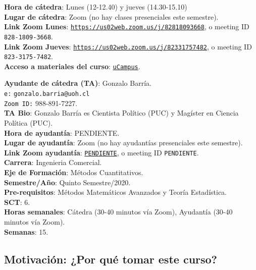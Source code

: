 \documentclass[letterpaper]{article}
\begin{document}
\vspace{5mm}
{\bf Hora de c\'atedra}: Lunes (12-12.40) y jueves (14.30-15.10)\\
{\bf Lugar de c\'atedra}: Zoom (no hay clases presenciales este semestre).\\
{\bf Link Zoom Lunes}: \href{https://us02web.zoom.us/j/82818093668}{\texttt{https://us02web.zoom.us/j/82818093668}}, o meeting ID {\texttt{828-1809-3668}}.\\
{\bf Link Zoom Jueves}: \href{https://us02web.zoom.us/j/82331757482}{\texttt{https://us02web.zoom.us/j/82331757482}}, o meeting ID {\texttt{823-3175-7482}}.\\

{\bf Acceso a materiales del curso}: \href{https://ucampus.uoh.cl/uoh/2020/1/ICE3201/1}{\texttt{uCampus}}.

\vspace{5mm}
{\bf Ayudante de c\'atedra (TA)}: Gonzalo Barr\'ia.\\
\texttt{e:} {\texttt{gonzalo.barria@uoh.cl}}\\
\texttt{Zoom ID:} 988-891-7227.\\
{\bf TA Bio}: Gonzalo Barr\'ia es Cientista Pol\'itico (PUC) y Mag\'ister en Ciencia Pol\'itica (PUC).\\
{\bf Hora de ayudant\'ia}: {\color{red}PENDIENTE}.\\
{\bf Lugar de ayudant\'ia}: Zoom (no hay ayudant\'ias presenciales este semestre).\\
{\bf Link Zoom ayudant\'ia}: \href{https://us02web.zoom.us/j/82257959416}{\texttt{PENDIENTE}}, o meeting ID {\texttt{PENDIENTE}}.\\


\vspace{5mm}
{\bf Carrera}:  Ingenieria Comercial.\\
{\bf Eje de Formaci\'on}: M\'etodos Cuantitativos.\\
{\bf Semestre/A\~no}: Quinto Semestre/2020.\\
{\bf Pre-requisitos}: M\'etodos Matem\'aticos Avanzados y Teor\'ia Estad\'istica.\\
{\bf SCT}: 6.\\
{\bf Horas semanales}: C\'atedra (30-40 minutos v\'ia Zoom), Ayudant\'ia  (30-40 minutos v\'ia Zoom). \\
{\bf Semanas}:  15.\\



\subsection*{Motivaci\'on: ¿Por qu\'e tomar este curso?}
\end{document}
